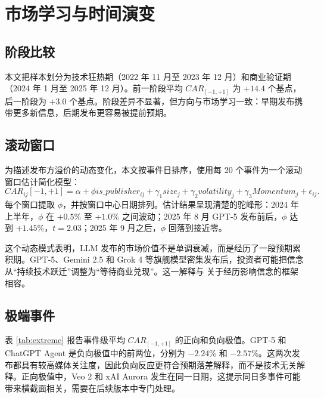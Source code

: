 \documentclass[11pt,fontset=fandol]{ctexart}
\begin{document}
\section{市场学习与时间演变}
\label{sec:time}

\subsection{阶段比较}

本文把样本划分为技术狂热期（2022 年 11 月至 2023 年 12 月）和商业验证期（2024 年 1 月至 2025 年 12 月）。前一阶段平均 $CAR_{[-1,+1]}$ 为 $+14.4$ 个基点，后一阶段为 $+3.0$ 个基点。阶段差异不显著，但方向与市场学习一致：早期发布携带更多新信息，后期发布更容易被提前预期。

\subsection{滚动窗口}

为描述发布方溢价的动态变化，本文按事件日排序，使用每 20 个事件为一个滚动窗口估计简化模型：
\begin{equation}
CAR_{ij}[-1,+1] =
\alpha
+ \phi is\_publisher_{ij}
+ \gamma_1 size_j
+ \gamma_2 volatility_j
+ \gamma_3 Momentum_j
+ \epsilon_{ij}.
\label{eq:roll}
\end{equation}
每个窗口提取 $\phi$，并按窗口中心日期排列。估计结果呈现清楚的驼峰形：2024 年上半年，$\phi$ 在 $+0.5\%$ 至 $+1.0\%$ 之间波动；2025 年 8 月 GPT-5 发布前后，$\phi$ 达到 $+1.45\%$，$t=2.03$；2025 年 9 月之后，$\phi$ 回落到接近零。

这个动态模式表明，LLM 发布的市场价值不是单调衰减，而是经历了一段预期累积期。GPT-5、Gemini 2.5 和 Grok 4 等旗舰模型密集发布后，投资者可能把信念从“持续技术跃迁”调整为“等待商业兑现”。这一解释与 \citet{MalmendierShen2024} 关于经历影响信念的框架相容。

\subsection{极端事件}

表 \ref{tab:extreme} 报告事件级平均 $CAR_{[-1,+1]}$ 的正向和负向极值。GPT-5 和 ChatGPT Agent 是负向极值中的前两位，分别为 $-2.24\%$ 和 $-2.57\%$。这两次发布都具有较高媒体关注度，因此负向反应更符合预期落差解释，而不是技术无关解释。正向极值中，Veo 2 和 xAI Aurora 发生在同一日期，这提示同日多事件可能带来横截面相关，需要在后续版本中专门处理。
\end{document}
